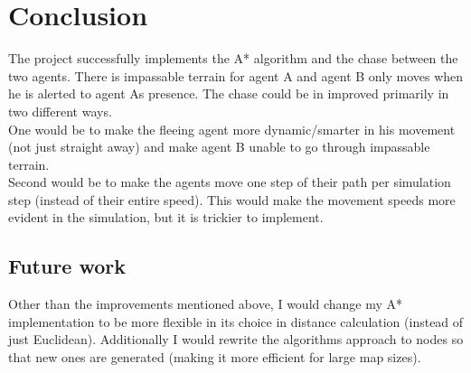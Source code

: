 \section{Conclusion}
The project successfully implements the A* algorithm and the chase between the two agents. There is impassable terrain for agent A and agent B only moves when he is alerted to agent As presence. The chase could be in improved primarily in two different ways. 
\\One would be to make the fleeing agent more dynamic/smarter in his movement (not just straight away) and make agent B unable to go through impassable terrain.
\\Second would be to make the agents move one step of their path per simulation step (instead of their entire speed). This would make the movement speeds more evident in the simulation, but it is trickier to implement.

\subsection{Future work}
Other than the improvements mentioned above, I would change my A* implementation to be more flexible in its choice in distance calculation (instead of just Euclidean). Additionally I would rewrite the algorithms approach to nodes so that new ones are generated (making it more efficient for large map sizes).